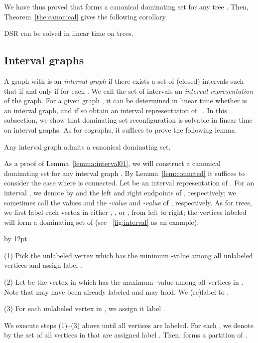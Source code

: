 \documentclass{llncs}
\newenvironment{listing}[1]{\begin{list}{*}{\settowidth{\labelwidth}{#1}\setlength{\leftmargin}{\labelwidth}\advance \leftmargin by 12pt
\setlength{\itemsep}{0pt}\setlength{\parsep}{0pt}\setlength{\topsep}{0pt}\setlength{\parskip}{0pt}}}{\end{list}}
\begin{document}
We have thus proved that  forms a canonical dominating set for any tree .
Then, Theorem~\ref{the:canonical} gives the following corollary.
\begin{corollary}
{\sc DSR} can be solved in linear time on trees.
\end{corollary}

\subsection{Interval graphs}\label{dsr:alinterval}
A graph  with  is an {\em interval graph} if
there exists a set  of (closed) intervals  such
that  if and only if  for each .
We call the set  of intervals an {\em interval representation} of the graph.
For a given graph , it can be determined in linear time whether  is
an interval graph, and if so obtain an interval representation of ~\cite{KM89}.
In this subsection, we show that {\sc dominating set reconfiguration} is solvable in linear time on interval graphs.
As for cographs, it suffices to prove the following lemma.
\begin{lemma}\label{lemma:interval01}
Any interval graph admits a canonical dominating set.
\end{lemma}

As a proof of Lemma~\ref{lemma:interval01}, we will construct a canonical dominating set for any interval graph .
By Lemma~\ref{lem:conncted} it suffices to consider the case where  is connected.
Let  be an interval representation of .
For an interval , we denote by  and  the left and right endpoints of , respectively;
we sometimes call the values  and  the {\em -value} and {\em -value} of , respectively.
As for trees, we first label each vertex in  either , , or , from left to right;
the vertices labeled  will form a dominating set of  (see \figurename~\ref{fig:interval} as an example):
\begin{listing}{aaa}
\item[(1)] Pick the unlabeled vertex  which has the minimum -value among all unlabeled vertices and assign  label .
\item[(2)] Let  be the vertex in  which has the maximum -value among all vertices in .
            Note that  may have been already labeled and  may hold.
			We (re)label  to .
\item[(3)] For each unlabeled vertex in , we assign it label .
\end{listing}

\noindent
We execute steps (1)--(3) above until all vertices are labeled.
For each , we denote by  the set of all vertices in  that are assigned label .
Then,  forms a partition of .
\end{document}
